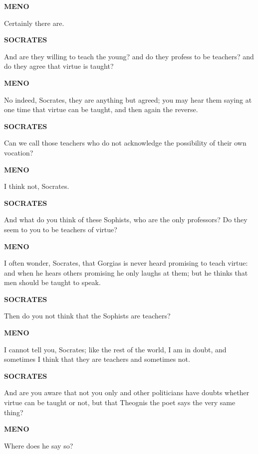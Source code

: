 \documentclass[11pt,letter]{article}
\begin{document}
\par \textbf{MENO}
\par   Certainly there are.

\par \textbf{SOCRATES}
\par   And are they willing to teach the young? and do they profess to be teachers? and do they agree that virtue is taught?

\par \textbf{MENO}
\par   No indeed, Socrates, they are anything but agreed; you may hear them saying at one time that virtue can be taught, and then again the reverse.

\par \textbf{SOCRATES}
\par   Can we call those teachers who do not acknowledge the possibility of their own vocation?

\par \textbf{MENO}
\par   I think not, Socrates.

\par \textbf{SOCRATES}
\par   And what do you think of these Sophists, who are the only professors? Do they seem to you to be teachers of virtue?

\par \textbf{MENO}
\par   I often wonder, Socrates, that Gorgias is never heard promising to teach virtue:  and when he hears others promising he only laughs at them; but he thinks that men should be taught to speak.

\par \textbf{SOCRATES}
\par   Then do you not think that the Sophists are teachers?

\par \textbf{MENO}
\par   I cannot tell you, Socrates; like the rest of the world, I am in doubt, and sometimes I think that they are teachers and sometimes not.

\par \textbf{SOCRATES}
\par   And are you aware that not you only and other politicians have doubts whether virtue can be taught or not, but that Theognis the poet says the very same thing?

\par \textbf{MENO}
\par   Where does he say so?
\end{document}
